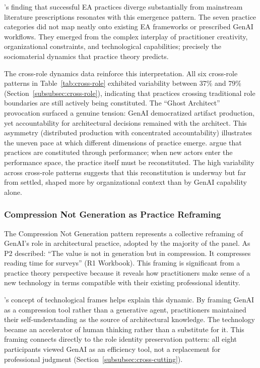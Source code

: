 \textcite{kotusev_enterprise_2018}'s finding that successful EA practices
diverge substantially from mainstream literature prescriptions resonates
with this emergence pattern. The seven practice categories did not map neatly
onto existing EA frameworks or prescribed GenAI workflows. They emerged from
the complex interplay of practitioner creativity, organizational constraints,
and technological capabilities; precisely the sociomaterial dynamics that
practice theory predicts.

The cross-role dynamics data reinforce this interpretation. All six cross-role
patterns in Table~\ref{tab:cross-role} exhibited variability between 37\% and
79\% (Section~\ref{subsubsec:cross-role}), indicating that practices crossing
traditional role boundaries are still actively being constituted. The ``Ghost
Architect'' provocation surfaced a genuine tension: GenAI democratized artifact
production, yet accountability for architectural decisions remained with the
architect. This asymmetry (distributed production with
concentrated accountability) illustrates the uneven pace at which different
dimensions of practice emerge. \textcite{feldman_theorizing_2011} argue that
practices are constituted through performance; when new actors enter the
performance space, the practice itself must be reconstituted. The high
variability across cross-role patterns suggests that this reconstitution is
underway but far from settled, shaped more by organizational context than by
GenAI capability alone.

\subsubsection{Compression Not Generation as Practice Reframing}

The Compression Not Generation pattern represents a collective reframing of
GenAI's role in architectural practice, adopted by the majority of the panel. As P2 described: ``The value is not in generation
but in compression. It compresses reading time for surveys'' (R1 Workbook).
This framing is significant from a practice theory perspective because it
reveals how practitioners make sense of a new technology in terms compatible
with their existing professional identity.

\textcite{orlikowski_technological_1994}'s concept of technological frames
helps explain this dynamic. By framing GenAI as a compression tool rather than
a generative agent, practitioners maintained their self-understanding as the
source of architectural knowledge. The technology became an accelerator of
human thinking rather than a substitute for it. This framing connects directly
to the role identity preservation pattern: all eight participants viewed GenAI
as an efficiency tool, not a replacement for professional judgment
(Section~\ref{subsubsec:cross-cutting}).

